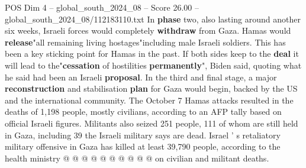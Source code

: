 \begin{textsample}{POS Dim 4 – global\_south\_2024\_08 – Score 26.00 – global\_south\_2024\_08/112183110.txt}
In \textbf{phase} two, also lasting around another six weeks, Israeli forces would completely \textbf{withdraw} from Gaza.
Hamas would \textbf{release}"all remaining living hostages"including male Israeli soldiers.
This has been a key sticking point for Hamas in the past.
If both sides keep to the \textbf{deal} it will lead to the"\textbf{cessation} of hostilities \textbf{permanently}", Biden said, quoting what he said had been an Israeli \textbf{proposal}.
In the third and final stage, a major \textbf{reconstruction} and stabilisation \textbf{plan} for Gaza would begin, backed by the US and the international community.
The October 7 Hamas attacks resulted in the deaths of 1,198 people, mostly civilians, according to an AFP tally based on official Israeli figures.
Militants also seized 251 people, 111 of whom are still held in Gaza, including 39 the Israeli military says are dead.
Israel ' s retaliatory military offensive in Gaza has killed at least 39,790 people, according to the health ministry @ @ @ @ @ @ @ @ @ @ on civilian and militant deaths.

\end{textsample}

